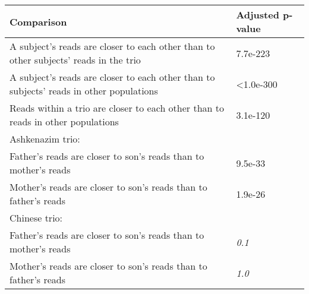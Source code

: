 \begin{samepage} \begin{table}[h!] \small \begin{tabular}{ll}
\hline
\textbf{Comparison}                                                                     & \textbf{Adjusted p-value} \\
\hline
A subject's reads are closer to each other than to other subjects' reads in the trio    & 7.7e-223                  \\
A subject's reads are closer to each other than to subjects' reads in other populations & <1.0e-300                 \\
Reads within a trio are closer to each other than to reads in other populations         & 3.1e-120                  \\
Ashkenazim trio:                                                                        & \textbf{}                 \\
Father's reads are closer to son's reads than to mother's reads                         & 9.5e-33                   \\
Mother's reads are closer to son's reads than to father's reads                         & 1.9e-26                   \\
Chinese trio:                                                                           & \textbf{}                 \\
Father's reads are closer to son's reads than to mother's reads                         & \textit{0.1}              \\
Mother's reads are closer to son's reads than to father's reads                         & \textit{1.0}              \\
\hline
\end{tabular}
\caption{}
\label{}
\end{table}
\end{samepage}
